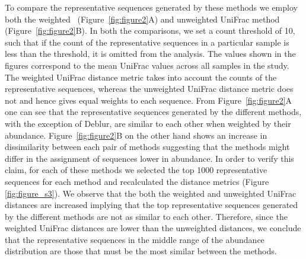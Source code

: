   To compare the representative sequences generated by these methods we employ both the weighted~\cite{Lozupone2007} (Figure~\ref{fig:figure2}A) and unweighted UniFrac method~\cite{Lozupone2005} (Figure~\ref{fig:figure2}B).
  In both the comparisons, we set a count threshold of 10, such that if the count of the representative sequences in a particular sample is less than the threshold, it is omitted from the analysis.
  The values shown in the figures correspond to the mean UniFrac values across all samples in the study.
  The weighted UniFrac distance metric takes into account the counts of the representative sequences, whereas the unweighted UniFrac distance metric does not and hence gives equal weights to each sequence.
  From Figure~\ref{fig:figure2}A one can see that the representative sequences generated by the different methods, with the exception of Deblur, are similar to each other when weighted by their abundance.
  Figure~\ref{fig:figure2}B on the other hand shows an increase in dissimilarity between each pair of methods suggesting that the methods might differ in the assignment of sequences lower in abundance.
  In order to verify this claim, for each of these methods we selected the top 1000 representative sequences for each method and recalculated the distance metrics (Figure \ref{fig:figure_s3}).
  We observe that the both the weighted and unweighted UniFrac distances are increased implying that the top representative sequences generated by the different methods are not as similar to each other.
  Therefore, since the weighted UniFrac distances are lower than the unweighted distances, we conclude that the representative sequences in the middle range of the abundance distribution are those that must be the most similar between the methods.

